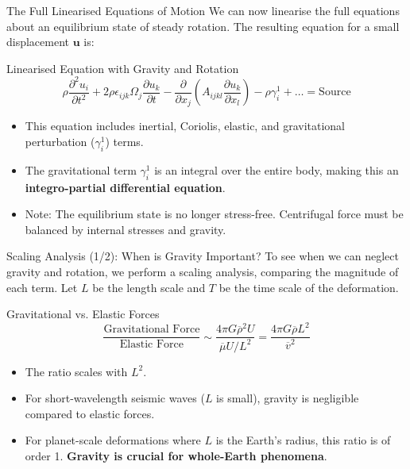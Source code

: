 \documentclass{beamer}
\begin{document}
\begin{frame}{The Full Linearised Equations of Motion}
    We can now linearise the full equations about an equilibrium state of steady rotation. The resulting equation for a small displacement $ \mathbf{u} $ is:
    \pause
    \begin{alertblock}{Linearised Equation with Gravity and Rotation}
        $$ \rho\frac{\partial^{2}u_{i}}{\partial t^{2}} + 2\rho\epsilon_{ijk}\Omega_{j}\frac{\partial u_{k}}{\partial t} - \frac{\partial}{\partial x_{j}}(A_{ijkl}\frac{\partial u_{k}}{\partial x_{l}}) - \rho\gamma_{i}^{1} + \dots = \text{Source} $$
    \end{alertblock}
    \pause
    \begin{itemize}
        \item This equation includes inertial, Coriolis, elastic, and gravitational perturbation ($ \gamma_i^1 $) terms.
        \pause
        \item The gravitational term $ \gamma_i^1 $ is an integral over the entire body, making this an \textbf{integro-partial differential equation}.
        \pause
        \item Note: The equilibrium state is no longer stress-free. Centrifugal force must be balanced by internal stresses and gravity.
    \end{itemize}
\end{frame}

\begin{frame}{Scaling Analysis (1/2): When is Gravity Important?}
    To see when we can neglect gravity and rotation, we perform a scaling analysis, comparing the magnitude of each term. Let $L$ be the length scale and $T$ be the time scale of the deformation.
    \pause
    \begin{block}{Gravitational vs. Elastic Forces}
        $$ \frac{\text{Gravitational Force}}{\text{Elastic Force}} \sim \frac{4\pi G\overline{\rho}^{2}U}{\overline{\mu}U / L^{2}} = \frac{4\pi G\overline{\rho}L^{2}}{\overline{v}^{2}} $$
    \end{block}
    \pause
    \begin{itemize}
        \item The ratio scales with $ L^2 $.
        \item For short-wavelength seismic waves ($L$ is small), gravity is negligible compared to elastic forces.
        \pause
        \item For planet-scale deformations where $L$ is the Earth's radius, this ratio is of order 1. \textbf{Gravity is crucial for whole-Earth phenomena}.
    \end{itemize}
\end{frame}
\end{document}
